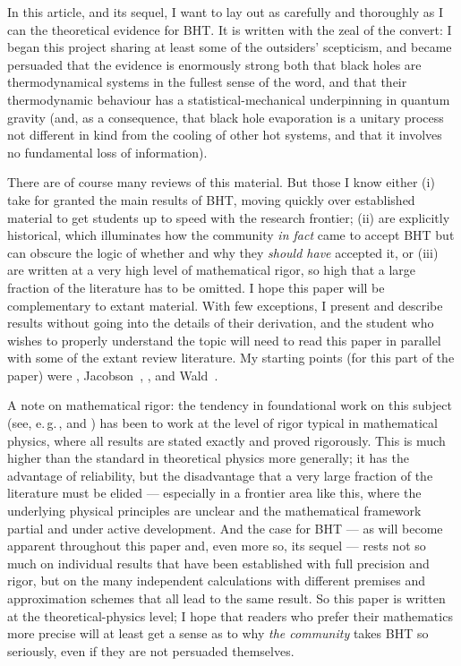\documentclass[12pt]{article}
\newcommand{\egc}{\mbox{e.\,g.\,}}
\begin{document}
In this article, and its sequel, I want to lay out as carefully and thoroughly as I can the theoretical evidence for BHT. It is written with the zeal of the convert: I began this project sharing at least some of the outsiders' scepticism, and became persuaded that the evidence is enormously strong both that black holes are thermodynamical systems in the fullest sense of the word, and that their thermodynamic behaviour has a statistical-mechanical underpinning in quantum gravity (and, as a consequence, that black hole evaporation is a unitary process not different in kind from the cooling of other hot systems, and that it involves no fundamental loss of information). 

There are of course many reviews of this material. But those I know either (i) take for granted the main results of BHT, moving quickly over established material to get students up to speed with the research frontier; (ii) are explicitly historical, which illuminates how the community \emph{in fact} came to accept BHT but can obscure the logic of whether and why they \emph{should have} accepted it, or (iii) are written at a very high level of mathematical rigor, so high that a large fraction of the literature has to be omitted. I hope this paper will be complementary to extant material. With few exceptions, I present and describe results without going into the details of their derivation, and the student who wishes to properly understand the topic will need to read this paper in parallel with some of the extant review literature. My starting points (for this part of the paper) were , Jacobson~\citeyear{jacobsonblackholelectures,jacobsonqft}, , and Wald~\citeyear{waldqft,wald2001}.

A note on mathematical rigor: the tendency in foundational work on this subject (see, \egc,  and ) has been to work at the level of rigor typical in mathematical physics, where all results are stated exactly and proved rigorously. This is much higher than the standard in theoretical physics more generally; it has the advantage of reliability, but the disadvantage that a very large fraction of the literature must be elided --- especially in a frontier area like this, where the underlying physical principles are unclear and the mathematical framework partial and under active development. And the case for BHT --- as will become apparent throughout this paper and, even more so, its sequel --- rests not so much on individual results that have been established with full precision and rigor, but on the many independent calculations with different premises and approximation schemes that all lead to the same result. So this paper is written at the theoretical-physics level; I hope that readers who prefer their mathematics more precise will at least get a sense as to why \emph{the community} takes BHT so seriously, even if they are not persuaded themselves.
\end{document}
